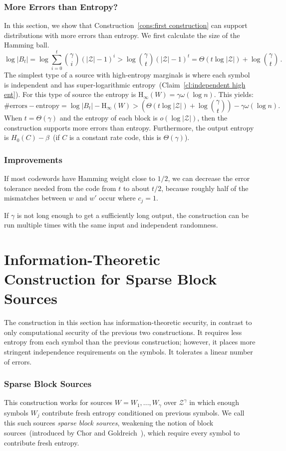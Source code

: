 \documentclass[11pt]{article}
\renewcommand{\paragraph}[1]{\subsubsection{#1}}
\newcommand{\clref}[1]{\mbox{Claim~\ref{#1}}}
\newcommand{\consref}[1]{\mbox{Construction~\ref{#1}}}
\newcommand{\Hoo}{\mathrm{H}_\infty}
\begin{document}
\paragraph{More Errors than Entropy?}
\label{sec:discussion}
In this section, we show that \consref{cons:first construction} can support distributions with more errors than entropy.
We first calculate the size of the Hamming ball.
\[
\log |B_t| = \log \sum_{i=0}^t {\gamma \choose i} (|\mathcal{Z}|-1)^i> \log {\gamma \choose t} (|\mathcal{Z}|-1)^t =\Theta(t\log |\mathcal{Z}|) + \log {\gamma\choose t}\,.
\]
The simplest type of a source with high-entropy marginals is where each symbol is independent and has super-logarithmic entropy~(\clref{cl:independent high ent}).  For this type of source the entropy is $\Hoo(W) = \gamma\omega(\log n)$.  This yields:
\[
\text{\# errors} - \text{entropy} = \log |B_t| -  \Hoo(W)  >\left( \Theta(t\log |\mathcal{Z}|) + \log {\gamma \choose t}\right) -  \gamma \omega(\log n) .
\]
When $t =\Theta(\gamma)$ and the entropy of each block is $o(\log |\mathcal{Z}|)$, then the construction supports more errors than entropy. Furthermore, the output entropy is $H_0(C) -\beta$~(if $C$ is a constant rate code, this is $\Theta(\gamma)$).

\paragraph{Improvements}  If most codewords have Hamming weight close to $1/2$, we can decrease the error tolerance needed from the code from $t$ to  about $t/2$, because roughly half of the mismatches between $w$ and $w'$ occur where $c_j =1$.

If $\gamma$ is not long enough to get a sufficiently long output, the construction can be run multiple times with the same input and independent randomness.


\section{Information-Theoretic Construction for Sparse Block Sources}
\label{sec:info theory cons}
The construction in this section has information-theoretic security, in contrast to only computational security of the previous two constructions. It requires less entropy from each symbol than the previous construction; however, it places more stringent independence requirements on the symbols. It tolerates a linear number of errors.

\paragraph{Sparse Block Sources}
This construction works for sources $W=W_1, ... ,W_\gamma$ over $\mathcal{Z}^\gamma $ in which enough symbols $W_j$ contribute fresh entropy conditioned on previous symbols.  We call this such sources \emph{sparse block sources}, weakening the notion of block sources~(introduced by Chor and Goldreich~\cite{DBLP:journals/siamcomp/ChorG88}), which require every symbol to contribute fresh entropy.
\end{document}
